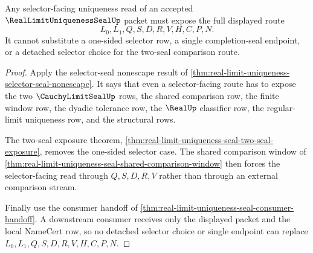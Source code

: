 \begin{theorem}
\label{thm:real-limit-uniqueness-seal-selector-route-coverage}
Any selector-facing uniqueness read of an accepted $\RealLimitUniquenessSealUp$ packet must expose the full displayed route
$$
L_0,L_1,Q,S,D,R,V,H,C,P,N.
$$
It cannot substitute a one-sided selector row, a single completion-seal endpoint, or a detached selector choice for the two-seal comparison route.
\end{theorem}
\begin{proof}
Apply the selector-seal nonescape result of \autoref{thm:real-limit-uniqueness-selector-seal-nonescape}. It says that even a selector-facing route has to expose the two $\CauchyLimitSealUp$ rows, the shared comparison row, the finite window row, the dyadic tolerance row, the $\RealUp$ classifier row, the regular-limit uniqueness row, and the structural rows.

The two-seal exposure theorem, \autoref{thm:real-limit-uniqueness-seal-two-seal-exposure}, removes the one-sided selector case. The shared comparison window of \autoref{thm:real-limit-uniqueness-seal-shared-comparison-window} then forces the selector-facing read through $Q,S,D,R,V$ rather than through an external comparison stream.

Finally use the consumer handoff of \autoref{thm:real-limit-uniqueness-seal-consumer-handoff}. A downstream consumer receives only the displayed packet and the local NameCert row, so no detached selector choice or single endpoint can replace $L_0,L_1,Q,S,D,R,V,H,C,P,N$.
\end{proof}

